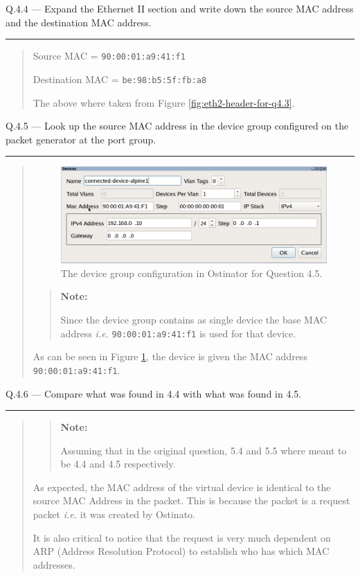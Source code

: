\documentclass{article}
\newcommand\Que[2]{%
   \begin{samepage}
   \leavevmode\par
   \noindent
   Q.#1 --- #2\par\vspace{10pt}\hrule\vspace{10pt}
   \end{samepage}}
\newenvironment{ans}
   {\fbox{Answer}\begin{quote}\nopagebreak}
   {\end{quote}}
\newcommand\ie{\emph{i.e.}}
\newenvironment{note}{%
    \begin{quote}
    \textbf{Note:}%
}{%
    \end{quote}%
}
\begin{document}
\Que{4.4}{Expand the Ethernet II section and write down the
source MAC address and the destination MAC address.}

\begin{ans}
Source MAC = \texttt{90:00:01:a9:41:f1}

Destination MAC = \texttt{be:98:b5:5f:fb:a8}

The above where taken from Figure \ref{fig:eth2-header-for-q4.3}.
\end{ans}

\newpage

\Que{4.5}{Look up the source MAC address in the device group
configured on the packet generator at the port group.}
\begin{ans}
\begin{figure}[H]
   \centering
   \includegraphics[width=14cm]{data/q4.5-device-group-config.png}
   \caption{The device group configuration in Ostinator for
   Question 4.5.}
   \label{fig:devic-config-q4.5}
\end{figure}
\begin{note}
	Since the device group contains as single device the
	base MAC address \ie{} \texttt{90:00:01:a9:41:f1} is used for that
	device.
\end{note}

As can be seen in Figure \ref{fig:devic-config-q4.5}, the device is given the MAC address \texttt{90:00:01:a9:41:f1}.
\end{ans}

\Que{4.6}{Compare what was found in 4.4 with what was found in
4.5.}
\begin{ans}
	\begin{note}
		Assuming that in the original question, 5.4 and 5.5 where
		meant to be 4.4 and 4.5 respectively.
	\end{note}
	
	As expected, the MAC address of the virtual device is
	identical to the source MAC Address in the packet. This is
	because the packet is a request packet \ie{} it
	was created by Ostinato.
	
	It is also critical to notice that the request is very much
	dependent on ARP (Address Resolution Protocol) to
	establish who has which MAC addresses.
\end{ans}
\end{document}
